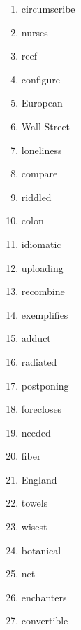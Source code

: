 \documentclass{article}
\author{}
\title{}
\date{}
\begin{document}
  \parbox{0.3\linewidth}{
    \begin{enumerate}
      \item circumscribe
      \item nurses
      \item reef
      \item configure
      \item European
      \item Wall Street
      \item loneliness
      \item compare
      \item riddled
      \item colon
      \item idiomatic
      \item uploading
      \item recombine
      \item exemplifies
      \item adduct
      \item radiated
      \item postponing
      \item forecloses
      \item needed
      \item fiber
      \item England
      \item towels
      \item wisest
      \item botanical
      \item net
      \item enchanters
      \item convertible
    \end{enumerate}
  }
\end{document}
